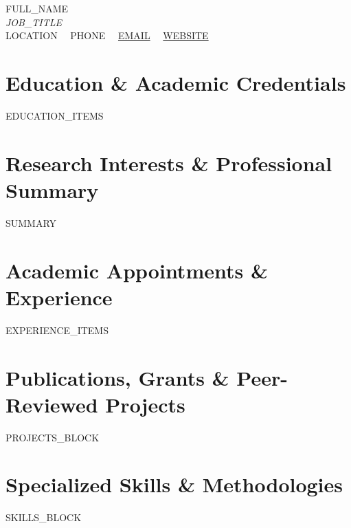 \documentclass[10pt,letterpaper]{article}
\begin{document}
\begin{center}
  {\LARGE \textsc{{{FULL_NAME}}}} \\[4pt]
  {\small \textit{{{JOB_TITLE}}}} \\[5pt]
  \small
  {{LOCATION}} \ \textperiodcentered \ 
  {{PHONE}} \ \textperiodcentered \ 
  \href{mailto:{{EMAIL}}}{{{EMAIL}}} \ \textperiodcentered \ 
  \href{https://{{WEBSITE}}}{{{WEBSITE}}}
\end{center}

\vspace{4pt}

\section{Education \& Academic Credentials}
\small
{{EDUCATION_ITEMS}}

\section{Research Interests \& Professional Summary}
\small
{{SUMMARY}}

\section{Academic Appointments \& Experience}
\small
{{EXPERIENCE_ITEMS}}

\section{Publications, Grants \& Peer-Reviewed Projects}
\small
{{PROJECTS_BLOCK}}

\section{Specialized Skills \& Methodologies}
\small
{{SKILLS_BLOCK}}
\end{document}
